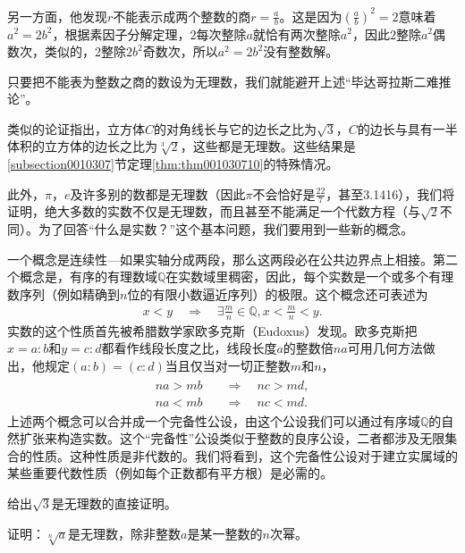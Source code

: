 另一方面，他发现$r$不能表示成两个整数的商$r = \frac{a}{b}$。这是因为$(\frac{a}{b})^2 = 2$意味着$a^2=2b^2$，根据素因子分解定理，$2$每次整除$a$就恰有两次整除$a^2$，因此$2$整除$a^2$偶数次，类似的，2整除$2b^2$奇数次，所以$a^2=2b^2$没有整数解。

只要把不能表为整数之商的数设为无理数，我们就能避开上述“毕达哥拉斯二难推论”。

类似的论证指出，立方体$C$的对角线长与它的边长之比为$\sqrt{3}$，$C$的边长与具有一半体积的立方体的边长之比为$\sqrt[3]{2}$，这些都是无理数。这些结果是\ref{subsection0010307}节定理\ref{thm:thm001030710}的特殊情况。

此外，$\pi$，$e$及许多别的数都是无理数（因此$\pi$不会恰好是$\frac{22}{7}$，甚至3.1416），我们将证明，绝大多数的实数不仅是无理数，而且甚至不能满足一个代数方程（与$\sqrt{2}$不同）。为了回答“什么是实数？”这个基本问题，我们要用到一些新的概念。

一个概念是连续性---如果实轴分成两段，那么这两段必在公共边界点上相接。第二个概念是，有序的有理数域$\mathbb{Q}$在实数域里稠密，因此，每个实数是一个或多个有理数序列（例如精确到$n$位的有限小数逼近序列）的极限。这个概念还可表述为
\begin{gather}\label{equ001040102}
x < y \quad \Rightarrow\quad \exists \frac{m}{n} \in \mathbb{Q}, x < \frac{m}{n} < y.
\end{gather}
实数的这个性质首先被希腊数学家欧多克斯（Eudoxus）发现。欧多克斯把$x=a:b$和$y=c:d$都看作线段长度之比，线段长度$a$的整数倍$na$可用几何方法做出，他规定$(a:b)=(c:d)$当且仅当对一切正整数$m$和$n$，
\begin{gather}\label{equ001040103}
\begin{aligned}
na > mb \quad &\Rightarrow \quad nc > md, \\
na < mb \quad &\Rightarrow \quad nc < md.
\end{aligned}
\end{gather}
上述两个概念可以合并成一个完备性公设，由这个公设我们可以通过有序域$\mathbb{Q}$的自然扩张来构造实数。这个“完备性”公设类似于整数的良序公设，二者都涉及无限集合的性质。这种性质是非代数的。我们将看到，这个完备性公设对于建立实属域的某些重要代数性质（例如每个正数都有平方根）是必需的。

\begin{problem}
给出$\sqrt{3}$是无理数的直接证明。
\end{problem}

\begin{problem}
证明：$\sqrt[n]{a}$是无理数，除非整数$a$是某一整数的$n$次幂。
\end{problem}

